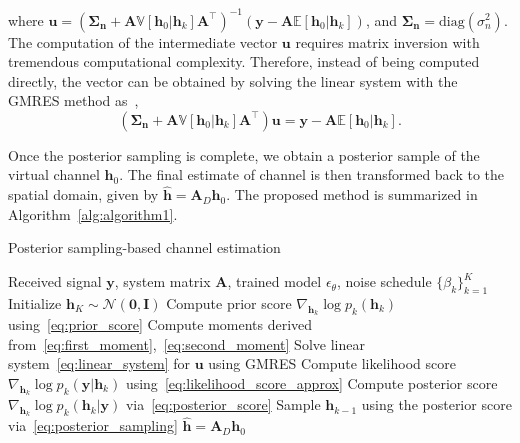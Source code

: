 \documentclass[lettersize,journal]{IEEEtran}
\begin{document}
where $\mathbf{u} = (\boldsymbol{\Sigma}_{\mathbf{n}}+\mathbf{A}\mathbb{V}[\mathbf{h}_{0}|\mathbf{h}_{k}]\mathbf{A}^{\top})^{-1}(\mathbf{y}- \mathbf{A}\mathbb{E}[\mathbf{h}_{0}|\mathbf{h}_{k}])$, and $\boldsymbol{\Sigma}_{\mathbf{n}} = \text{diag}(\sigma_{n}^{2})$. The computation of the intermediate vector $\mathbf{u}$ requires matrix inversion with tremendous computational complexity. Therefore, instead of being computed directly, the vector can be obtained by solving the linear system with the GMRES method as~\cite{saadGMRESGeneralizedMinimal1986},
\begin{equation}
\label{eq:linear_system}
(\boldsymbol{\Sigma}_{\mathbf{n}}+\mathbf{A}\mathbb{V}[\mathbf{h}_{0}|\mathbf{h}_{k}]\mathbf{A}^{\top})\mathbf{u} = \mathbf{y}- \mathbf{A}\mathbb{E}[\mathbf{h}_{0}|\mathbf{h}_{k}].
\end{equation}

Once the posterior sampling is complete, we obtain a posterior sample of the virtual channel $\mathbf{h}_{0}$. The final estimate of channel is then transformed back to the spatial domain, given by $\hat{\mathbf{h}} = \mathbf{A}_{D}\mathbf{h}_{0}$. The proposed method is summarized in Algorithm~\ref{alg:algorithm1}.

\begin{algorithm}[!t]
\caption{Posterior sampling-based channel estimation}
\label{alg:algorithm1}
\begin{algorithmic}[1]
\REQUIRE Received signal $\mathbf{y}$, system matrix $\mathbf{A}$, trained model $\epsilon_{\theta}$, noise schedule $\{\beta_{k}\}_{k=1}^{K}$
\STATE Initialize $\mathbf{h}_K \sim \mathcal{N}(\mathbf{0}, \mathbf{I})$
	\STATE Compute prior score $\nabla_{\mathbf{h}_{k}}\log p_{k}(\mathbf{h}_{k})$ using~\eqref{eq:prior_score}
	\STATE Compute moments derived from~\eqref{eq:first_moment},~\eqref{eq:second_moment}
	\STATE Solve linear system~\eqref{eq:linear_system} for $\mathbf{u}$ using GMRES
	\STATE Compute likelihood score $\nabla_{\mathbf{h}_{k}}\log p_{k}(\mathbf{y}|\mathbf{h}_{k})$ using~\eqref{eq:likelihood_score_approx}
	\STATE Compute posterior score $\nabla_{\mathbf{h}_{k}}\log p_{k}(\mathbf{h}_{k}|\mathbf{y})$ via~\eqref{eq:posterior_score}
	\STATE Sample $\mathbf{h}_{k-1}$ using the posterior score via~\eqref{eq:posterior_sampling}
\ENDFOR
\RETURN $\hat{\mathbf{h}} = \mathbf{A}_{D}\mathbf{h}_{0}$
\end{algorithmic}
\end{algorithm}
\end{document}
